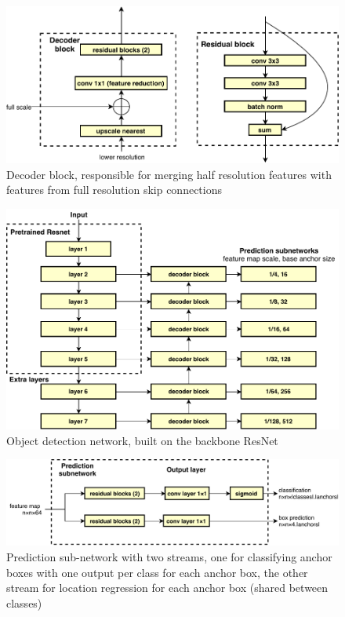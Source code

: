 \begin{figure}[h]
  \centering
  \includegraphics[width=1.0\linewidth]{figures/annotation/decoder_block.pdf}
  \caption{Decoder block, responsible for merging half resolution features with features from full resolution skip connections }  
  \label{fig:decoder_block}
\end{figure}


\begin{figure}[h]
  \centering
  \includegraphics[width=1.0\linewidth]{figures/annotation/detection_network.pdf}
  \caption{Object detection network, built on the backbone ResNet }  
  \label{fig:detection_network}
\end{figure}

\begin{figure}
  \centering
  \includegraphics[width=1.0\linewidth]{figures/annotation/prediction_subnet.pdf}
  \caption{Prediction sub-network with two streams, one for classifying anchor boxes with one output per class for each anchor box, the other stream for location regression for each anchor box (shared between classes)}    
  \label{fig:prediction_subnet}  
\end{figure}

